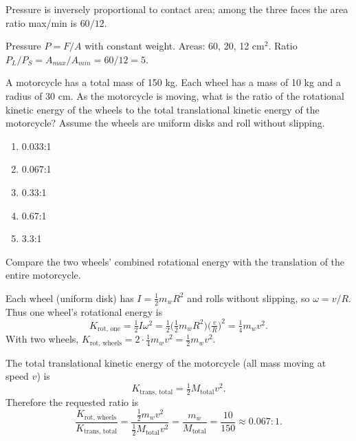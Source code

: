 \begin{answerbox}
\end{answerbox}
\begin{insightbox}
Pressure is inversely proportional to contact area; among the three faces the area ratio max/min is $60/12$.
\end{insightbox}
\begin{solutionbox}

Pressure $P=F/A$ with constant weight. Areas: 60, 20, 12 cm$^2$. Ratio $P_L/P_S=A_{max}/A_{min}=60/12=5$.
\end{solutionbox}

\item \label{prob:38}
A motorcycle has a total mass of 150 kg. Each wheel has a mass of 10 kg and a radius of 30 cm. As the motorcycle is moving, what is the ratio of the rotational kinetic energy of the wheels to the total translational kinetic energy of the motorcycle? Assume the wheels are uniform disks and roll without slipping.
\begin{enumerate}[label=(\Alph*)]
    \item 0.033:1
    \item 0.067:1
    \item 0.33:1
    \item 0.67:1
    \item 3.3:1
\end{enumerate}

\begin{answerbox}
\end{answerbox}
\begin{insightbox}
Compare the two wheels' combined rotational energy with the translation of the entire motorcycle.
\end{insightbox}
\begin{solutionbox}
Each wheel (uniform disk) has $I=\tfrac{1}{2}m_w R^2$ and rolls without slipping, so $\omega=v/R$. Thus one wheel's rotational energy is
\[
K_{\text{rot, one}}=\tfrac{1}{2}I\omega^2=\tfrac{1}{2}\Big(\tfrac{1}{2}m_w R^2\Big)\Big(\tfrac{v}{R}\Big)^2=\tfrac{1}{4}m_w v^2.
\]
With two wheels, $K_{\text{rot, wheels}}=2\cdot\tfrac{1}{4}m_w v^2=\tfrac{1}{2}m_w v^2$.

The total translational kinetic energy of the motorcycle (all mass moving at speed $v$) is
\[
K_{\text{trans, total}}=\tfrac{1}{2}M_{\text{total}}v^2.
\]
Therefore the requested ratio is
\[
\frac{K_{\text{rot, wheels}}}{K_{\text{trans, total}}}=\frac{\tfrac{1}{2}m_w v^2}{\tfrac{1}{2}M_{\text{total}}v^2}=\frac{m_w}{M_{\text{total}}}=\frac{10}{150}\approx0.067:1.
\]
\end{solutionbox}

